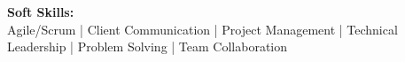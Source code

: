 \textbf{Soft Skills:} \\ Agile/Scrum | Client Communication | Project Management | Technical Leadership | Problem Solving | Team Collaboration